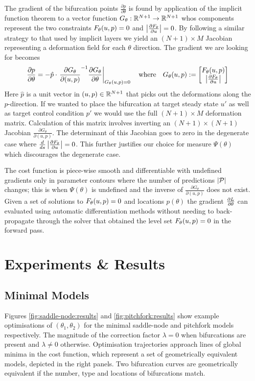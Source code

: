 The gradient of the bifurcation points $\frac{\partial p}{\partial\theta}$ is found by application of the implicit function theorem to a vector function $G_{\theta}:\mathbb{R}^{N+1}\rightarrow\mathbb{R}^{N+1}$ whos components represent the two constraints $F_{\theta}(u,p)=0$ and $\left| \frac{\partial F_{\theta}}{\partial u} \right|=0$. By following a similar strategy to that used by implicit layers \cite{Look2020DifferentiableLayers} we yield an $(N+1)\times M$ Jacobian representing a deformation field \cite{Jos2011OnSurface} for each $\theta$ direction. The gradient we are looking for becomes
\begin{align}
    \frac{\partial p}{\partial\theta} = -\hat{p}\cdot\left.\frac{\partial G_{\theta}}{\partial (u,p)}^{-1}
    \frac{\partial  G_{\theta}}{\partial\theta}\right|_{G_{\theta}(u,p)=0}
    \quad\mathrm{where}\quad
    G_{\theta}(u,p):=\begin{bmatrix}F_{\theta}(u,p)\\\left| \frac{\partial F_{\theta}}{\partial u} \right|\end{bmatrix}
    \label{eq:gradient-bifurcation}
\end{align}
Here $\hat{p}$ is a unit vector in $(u,p)\in\mathbb{R}^{N+1}$ that picks out the deformations along the $p$-direction. If we wanted to place the bifurcation at target steady state $u'$ as well as target control condition $p'$ we would use the full $(N+1)\times M$ deformation matrix. Calculation of this matrix involves inverting an $(N+1)\times(N+1)$ Jacobian $\frac{\partial G_{\theta}}{\partial(u,p)}$. The determinant of this Jacobian goes to zero in the degenerate case where $\frac{d}{ds}\left| \frac{\partial F_{\theta}}{\partial u} \right|=0$. This further justifies our choice for measure $\Psi(\theta)$ which discourages the degenerate case.

The cost function is piece-wise smooth and differentiable with undefined gradients only in parameter contours where the number of predictions $|\mathcal{P}|$ changes; this is when $\Psi(\theta)$ is undefined and the inverse of $\frac{\partial G_{\theta}}{\partial (u,p)}$ does not exist. Given a set of solutions to $F_{\theta}(u,p)=0$ and locations $p(\theta)$ the gradient $\frac{\partial L}{\partial\theta}$ can evaluated using automatic differentiation methods without needing to back-propagate through the solver that obtained the level set $F_{\theta}(u,p)=0$ in the forward pass.

\section{Experiments \& Results}

\subsection{Minimal Models}
Figures \ref{fig:saddle-node:results} and \ref{fig:pitchfork:results} show example optimisations of $(\theta_1,\theta_2)$ for the minimal saddle-node and pitchfork models respectively. The magnitude of the correction factor $\lambda=0$ when bifurcations are present and $\lambda\neq0$ otherwise. Optimisation trajectories approach lines of global minima in the cost function, which represent a set of geometrically equivalent models, depicted in the right panels. Two bifurcation curves are geometrically equivalent if the number, type and locations of bifurcations match.

